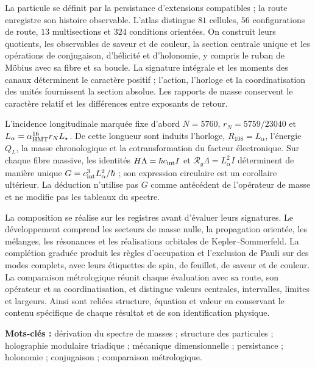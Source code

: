 La particule se définit par la persistance d’extensions compatibles ;
la route enregistre son histoire observable. L’atlas distingue \(81\) cellules,
\(56\) configurations de route, \(13\) multisections et \(324\) conditions
orientées. On construit leurs quotients, les observables de saveur et de couleur,
la section centrale unique et les opérations de conjugaison, d’hélicité et
d’holonomie, y compris le ruban de Möbius avec sa fibre et sa boucle. La signature
intégrale et les moments des canaux déterminent le caractère positif ;
l’action, l’horloge et la coordinatisation des unités fournissent la section
absolue. Les rapports de masse conservent le caractère relatif et les
différences entre exposants de retour.


L’incidence longitudinale marquée fixe d’abord
\(N=5760\), \(r_N=5759/23040\) et
\(L_\alpha=\alpha_{\rm HMT}^{16}r_NL_\star\). De cette longueur sont induits
l’horloge, \(R_{108}=L_\alpha\), l’énergie \(Q_L\), la masse chronologique et
la cotransformation du facteur électronique. Sur chaque fibre massive, les
identités \(H\Lambda=\hbar c_{\rm int}I\) et
\(\mathcal R_g\Lambda=L_\alpha^2I\) déterminent de manière unique
\(G=c_{\rm int}^3L_\alpha^2/\hbar\) ; son expression circulaire est un
corollaire ultérieur. La déduction n’utilise pas \(G\) comme antécédent de
l’opérateur de masse et ne modifie pas les tableaux du spectre.


La composition se réalise sur les registres avant d’évaluer leurs signatures.
Le développement comprend les secteurs de masse nulle, la propagation orientée,
les mélanges, les résonances et les réalisations orbitales de Kepler--Sommerfeld. La
complétion graduée produit les règles d’occupation et l’exclusion de
Pauli sur des modes complets, avec leurs étiquettes de spin, de feuillet, de saveur et de
couleur. La comparaison métrologique réunit chaque évaluation avec sa route,
son opérateur et sa coordinatisation, et distingue valeurs centrales, intervalles, limites et
largeurs. Ainsi sont reliées structure, équation et valeur en conservant le
contenu spécifique de chaque résultat et de son identification physique.


\noindent\textbf{Mots-clés :} dérivation du spectre de masses ;
structure des particules ; holographie modulaire triadique ; mécanique
dimensionnelle ; persistance ; holonomie ; conjugaison ; comparaison métrologique.

\par\endgroup
